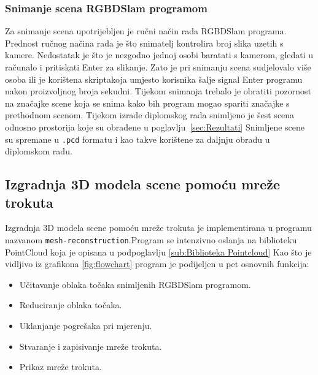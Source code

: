 
\newpage
\subsubsection{Snimanje scena RGBDSlam programom} %
\label{ssub:Snimanje scena RGBDSlam programom}

Za snimanje scena upotrijebljen je ručni način rada RGBDSlam programa.
Prednost ručnog načina rada je što snimatelj kontrolira broj slika
uzetih s kamere. Nedostatak je što je nezgodno jednoj osobi baratati s
kamerom, gledati u računalo i pritiskati Enter za slikanje. Zato je pri
snimanju scena sudjelovalo više osoba ili je korištena
skripta\footnotemark[1] koja umjesto korisnika šalje signal Enter
programu nakon proizvoljnog broja sekudni. Tijekom snimanja trebalo je
obratiti pozornost na značajke scene koja se snima kako bih program
mogao spariti značajke s prethodnom scenom. Tijekom izrade diplomskog
rada snimljeno je šest scena odnosno prostorija koje su obrađene u
poglavlju~\ref{sec:Rezultati} Snimljene scene su spremane u
\texttt{.pcd} formatu i kao takve korištene za daljnju obradu u
diplomskom radu.




\newpage
\subsection{Izgradnja 3D modela scene pomoću mreže trokuta} %
\label{sub:Izgradnja 3D modela scene pomoću mreže trokuta}

Izgradnja 3D modela scene pomoću mreže trokuta je implementirana u
programu nazvanom \texttt{mesh-reconstruction}.\footnotemark[1]
Program se intenzivno oslanja na biblioteku PointCloud koja je opisana u
podpoglavlju \ref{sub:Biblioteka Pointcloud} Kao što je vidljivo iz
grafikona \ref{fig:flowchart} program je podijeljen u pet osnovnih
funkcija:
\begin{itemize}
    \item Učitavanje oblaka točaka snimljenih RGBDSlam programom.
    \item Reduciranje oblaka točaka.
    \item Uklanjanje pogrešaka pri mjerenju.
    \item Stvaranje i zapisivanje mreže trokuta.
    \item Prikaz mreže trokuta.
\end{itemize}

